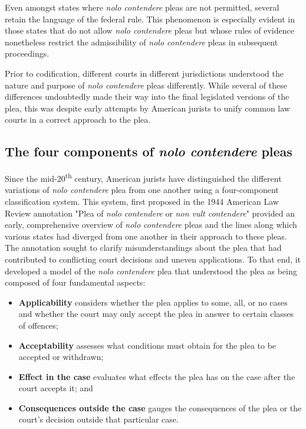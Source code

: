 Even amongst states where \textit{nolo contendere} pleas are not permitted, several retain the language of the federal rule. This phenomenon is especially evident in those states that do not allow \textit{nolo contendere} pleas but whose rules of evidence nonetheless restrict the admissibility of \textit{nolo contendere} pleas in subsequent proceedings.

Prior to codification, different courts in different jurisdictions understood the nature and purpose of \textit{nolo contendere} pleas differently. While several of these differences undoubtedly made their way into the final legislated versions of the plea, this was despite early attempts by American jurists to unify common law courts in a correct approach to the plea.

\subsection{The four components of \textit{nolo contendere} pleas}

Since the mid-20\textsuperscript{th} century, American jurists have distinguished the different variations of \textit{nolo contendere} plea from one another using a four-component classification system. This system, first proposed in the 1944 American Law Review annotation "Plea of \textit{nolo contendere} or \textit{non vult contendere}" provided an early, comprehensive overview of \textit{nolo contendere} pleas and the lines along which various states had diverged from one another in their approach to these pleas. The annotation sought to clarify misunderstandings about the plea that had contributed to conflicting court decisions and uneven applications. To that end, it developed a model of the \textit{nolo contendere} plea that understood the plea as being composed of four fundamental aspects:

\begin{itemize}
    \item \textbf{Applicability} considers whether the plea applies to some, all, or no cases and whether the court may only accept the plea in answer to certain classes of offences;
    \item \textbf{Acceptability} assesses what conditions must obtain for the plea to be accepted or withdrawn;
    \item \textbf{Effect in the case} evaluates what effects the plea has on the case after the court accepts it; and
    \item \textbf{Consequences outside the case} gauges the consequences of the plea or the court's decision outside that particular case.
\end{itemize}

